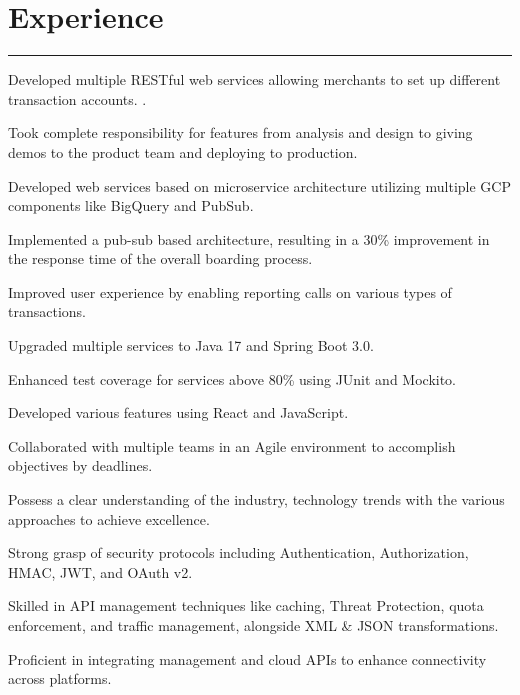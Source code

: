 \documentclass[]{deedy-resume-reversed}
\newcommand{\mysection}[2]{%
    \section{#1\hspace{0.5em}#2}
}
\begin{document}
%
%

\begin{minipage}[t]{0.60\textwidth}


\mysection{\faBriefcase}{Experience}
\rule{\textwidth}{0.4pt}
\vspace{\topsep} %
\begin{tightemize}
\item Developed multiple RESTful web services allowing merchants to set up different transaction accounts. .
\item Took complete responsibility for features from analysis and design to giving demos to the product team and deploying to production.
\item Developed web services based on microservice architecture utilizing multiple GCP components like BigQuery and PubSub. 
\item 
Implemented a pub-sub based architecture, resulting in a 30\% improvement in the response time of the overall boarding process.
\item Improved user experience by enabling reporting calls on various types of transactions. 
\item Upgraded multiple services to Java 17 and Spring Boot 3.0. 
\item Enhanced test coverage for services above 80\% using JUnit and Mockito.  
\item Developed various features using React and JavaScript. 
\item Collaborated with multiple teams in an Agile environment to accomplish objectives by deadlines. 
\end{tightemize}
\sectionsep

\descript{ }
\begin{tightemize}
\item Possess a clear understanding of the industry, technology trends with the various approaches to achieve excellence.
\item Strong grasp of security protocols including Authentication, Authorization, HMAC, JWT, and OAuth v2.
\item Skilled in API management techniques like caching, Threat Protection, quota enforcement, and traffic management, alongside XML \& JSON transformations.
\item Proficient in integrating management and cloud APIs to enhance connectivity across platforms. 
\end{tightemize}
\sectionsep


\end{minipage}
\end{document}
